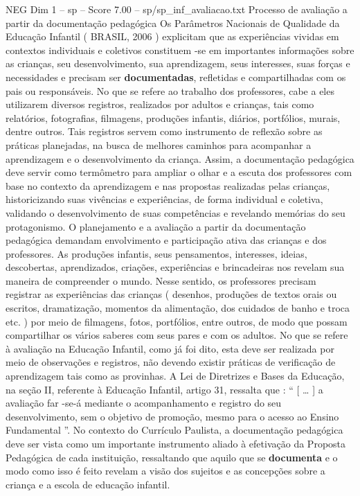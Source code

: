 \begin{textsample}{NEG Dim 1 – sp – Score 7.00 – sp/sp\_inf\_avaliacao.txt}  \label{ex:f1_neg_176}
Processo de avaliação a partir da documentação pedagógica Os Parâmetros Nacionais de Qualidade da Educação Infantil ( BRASIL, 2006 ) explicitam que as experiências vividas em contextos individuais e coletivos constituem -se em importantes informações sobre as crianças, seu desenvolvimento, sua aprendizagem, seus interesses, suas forças e necessidades e precisam ser \textbf{documentadas}, refletidas e compartilhadas com os pais ou responsáveis.
No que se refere ao trabalho dos professores, cabe a eles utilizarem diversos registros, realizados por adultos e crianças, tais como relatórios, fotografias, filmagens, produções infantis, diários, portfólios, murais, dentre outros.
Tais registros servem como instrumento de reflexão sobre as práticas planejadas, na busca de melhores caminhos para acompanhar a aprendizagem e o desenvolvimento da criança.
Assim, a documentação pedagógica deve servir como termômetro para ampliar o olhar e a escuta dos professores com base no contexto da aprendizagem e nas propostas realizadas pelas crianças, historicizando suas vivências e experiências, de forma individual e coletiva, validando o desenvolvimento de suas competências e revelando memórias do seu protagonismo.
O planejamento e a avaliação a partir da documentação pedagógica demandam envolvimento e participação ativa das crianças e dos professores.
As produções infantis, seus pensamentos, interesses, ideias, descobertas, aprendizados, criações, experiências e brincadeiras nos revelam sua maneira de compreender o mundo.
Nesse sentido, os professores precisam registrar as experiências das crianças ( desenhos, produções de textos orais ou escritos, dramatização, momentos da alimentação, dos cuidados de banho e troca etc. ) por meio de filmagens, fotos, portfólios, entre outros, de modo que possam compartilhar os vários saberes com seus pares e com os adultos.
No que se refere à avaliação na Educação Infantil, como já foi dito, esta deve ser realizada por meio de observações e registros, não devendo existir práticas de verificação de aprendizagem tais como as provinhas.
A Lei de Diretrizes e Bases da Educação, na seção II, referente à Educação Infantil, artigo 31, ressalta que : “ [ … ] a avaliação far -se-á mediante o acompanhamento e registro do seu desenvolvimento, sem o objetivo de promoção, mesmo para o acesso ao Ensino Fundamental ”.
No contexto do Currículo Paulista, a documentação pedagógica deve ser vista como um importante instrumento aliado à efetivação da Proposta Pedagógica de cada instituição, ressaltando que aquilo que se \textbf{documenta} e o modo como isso é feito revelam a visão dos sujeitos e as concepções sobre a criança e a escola de educação infantil.

\end{textsample}
